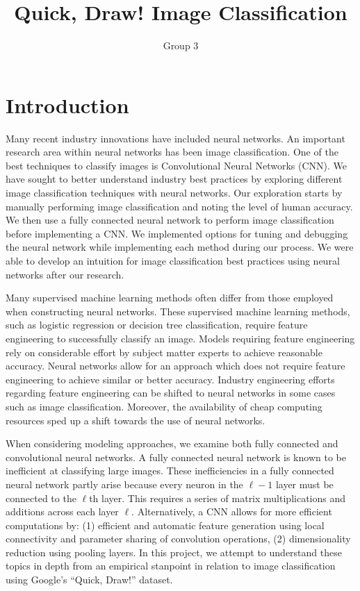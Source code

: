 \documentclass[12pt]{article}
\title{Quick, Draw! Image Classification}
\author{Group 3}
\begin{document}
\maketitle

\section{Introduction}

Many recent industry innovations have included neural networks. An
important research area within neural networks has been image classification.
One of the best techniques to classify images is Convolutional Neural
Networks (CNN). We have sought to better understand industry best practices
by exploring different image classification techniques with neural networks.
Our exploration starts by manually performing image classification and
noting the level of human accuracy. We then use a fully connected neural
network to perform image classification before implementing a CNN. We
implemented options for tuning and debugging the neural network while
implementing each method during our process. We were able to develop an
intuition for image classification best practices using neural networks
after our research.

Many supervised machine learning methods often differ from those employed 
when constructing neural networks. These supervised machine learning
methods, such as logistic regression or decision tree classification,
require feature engineering to successfully classify an image. Models
requiring feature engineering rely on considerable effort by subject matter
experts to achieve reasonable accuracy. Neural networks allow for an
approach which does not require feature engineering to achieve similar or
better accuracy. Industry engineering efforts regarding feature engineering
can be shifted to neural networks  in some cases such as image
classification. Moreover, the availability of cheap computing resources
sped up a shift towards the use of neural networks.

When considering modeling approaches, we examine both fully connected and 
convolutional neural networks. A fully connected neural network is known to 
be inefficient at classifying large images. These inefficiencies in a fully 
connected neural network partly arise because every neuron in the $\ell-1$
layer must be connected to the $\ell$th layer. This requires a series
of matrix multiplications and additions across each layer $\ell$.
Alternatively, a CNN allows for more efficient computations by: (1) efficient
and automatic feature generation using local connectivity and parameter
sharing of convolution operations, (2) dimensionality reduction using pooling
layers. In this project, we attempt to understand these topics in depth
from an empirical stanpoint in relation to image classification using
Google's ``Quick, Draw!'' dataset.
\end{document}
